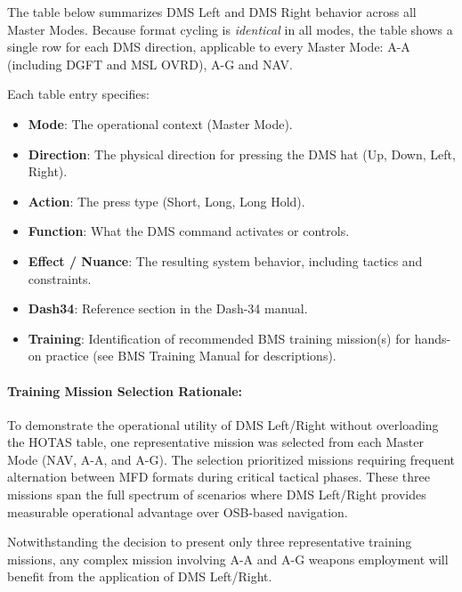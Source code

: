 \documentclass[11pt, a4paper, twoside]{report}
\begin{document}
The table below summarizes DMS Left and DMS Right behavior across all Master Modes. Because format cycling is \textit{identical} in all modes, the table shows a single row for each DMS direction, applicable to every Master Mode: A-A (including DGFT and MSL OVRD), A-G and NAV.

Each table entry specifies:

\begin{itemize}
	\item \textbf{Mode}: The operational context (Master Mode).
	\item \textbf{Direction}: The physical direction for pressing the DMS hat (Up, Down, Left, Right).
	\item \textbf{Action}: The press type (Short, Long, Long Hold).
	\item \textbf{Function}: What the DMS command activates or controls.
	\item \textbf{Effect / Nuance}: The resulting system behavior, including tactics and constraints.
	\item \textbf{Dash34}: Reference section in the Dash-34 manual.
	\item \textbf{Training}: Identification of recommended BMS training mission(s) for hands-on practice (see BMS Training Manual for descriptions).
\end{itemize}

\paragraph{Training Mission Selection Rationale:} To demonstrate the operational utility of DMS Left/Right without overloading the HOTAS table, one representative mission was selected from each Master Mode (NAV, A-A, and A-G). The selection prioritized missions requiring frequent alternation between MFD formats during critical tactical phases. These three missions span the full spectrum of scenarios where DMS Left/Right provides measurable operational advantage over OSB-based navigation.

Notwithstanding the decision to present only three representative training missions, any complex mission involving A-A and A-G weapons employment will benefit from the application of DMS Left/Right.
\end{document}
